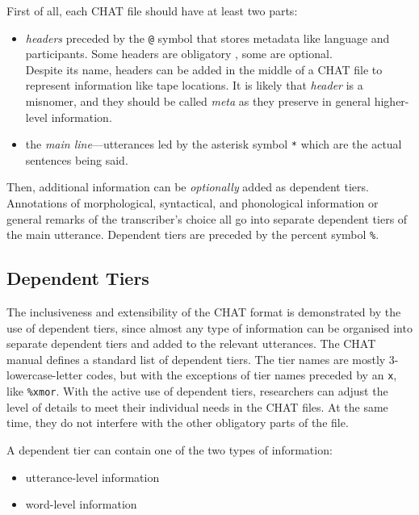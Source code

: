 First of all, each CHAT file should have at least two parts:
\begin{itemize}
	\item \emph{headers} preceded by the \texttt{@} symbol that stores metadata like language and participants. Some headers are obligatory , some are optional.\\
	Despite its name, headers can be added in the middle of a CHAT file to represent information like tape locations. It is likely that \emph{header} is a misnomer, and they should be called \emph{meta} as they preserve in general higher-level information.
	\item the \emph{main line}---utterances led by the asterisk symbol \texttt{*} which are the actual sentences being said.\\
\end{itemize}

Then, additional information can be \emph{optionally} added as dependent tiers. Annotations of morphological, syntactical, and phonological information or general remarks of the transcriber's choice all go into separate dependent tiers of the main utterance. Dependent tiers are preceded by the percent symbol \texttt{\%}.

\subsection{Dependent Tiers}
The inclusiveness and extensibility of the CHAT format is demonstrated by the use of dependent tiers, since almost any type of information can be organised into separate dependent tiers and added to the relevant utterances. The CHAT manual defines a standard list of dependent tiers. The tier names are mostly 3-lowercase-letter codes, but with the exceptions of tier names preceded by an \texttt{x}, like \texttt{\%xmor}. With the active use of dependent tiers, researchers can adjust the level of details to meet their individual needs in the CHAT files. At the same time, they do not interfere with the other obligatory parts of the file.

A dependent tier can contain one of the two types of information:
\begin{itemize}
	\item utterance-level information
	\item word-level information
\end{itemize}

